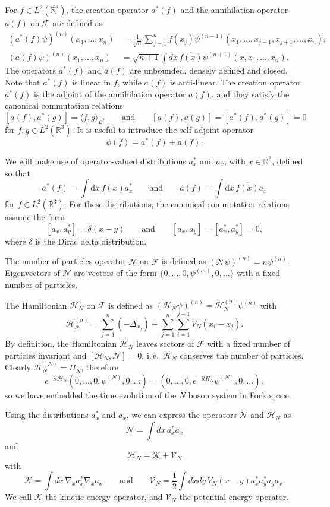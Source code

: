 \documentclass[11pt,a4paper,draft,DIV11]{scrartcl}	%
\newcommand{\R}{\mathds{R}}
\newcommand{\N}{\mathcal{N}}
\newcommand{\K}{\mathcal{K}}
\newcommand{\fock}{\mathcal{F}}		%
\newcommand{\di}{\textrm{d}}		%
\newcommand{\Ncal}{\mathcal{N}}		%
\newcommand{\Hcal}{\mathcal{H}}		%
\newcommand{\cc}[1]{\overline{#1}}	%
\begin{document}
For $f \in L^2(\R^3)$, the creation operator $a^*(f)$ and the annihilation
operator $a(f)$ on $\mathcal{F}$ are defined as
\[
  \begin{split}
    (a^*(f) \psi)^{(n)}(x_1, \dots, x_n) & = \frac{1}{\sqrt{n}} \sum_{j=1}^n
    f(x_j) \psi^{(n-1)}(x_1, \dots, x_{j-1}, x_{j+1}, \dots, x_n), \\
    (a(f) \psi)^{(n)}(x_1, \dots, x_n) & = \sqrt{n+1} \int dx \,
    \overline{f(x)} \psi^{(n+1)}(x, x_1, \dots, x_n).
  \end{split}
\]
The operators $a^*(f)$ and $a(f)$ are unbounded, densely defined and closed.
Note that $a^*(f)$ is linear in $f$, while $a(f)$ is anti-linear. The creation
operator $a^*(f)$ is the adjoint of the annihilation operator $a(f)$, and
they satisfy the canonical commutation relations
\[
  [a(f), a^*(g)] = \langle f, g \rangle_{L^2} \qquad \text{and} \qquad [a(f),
  a(g)] = [a^*(f), a^*(g)] = 0
\]
for $f,g \in L^2(\R^3)$. It is useful to introduce the self-adjoint operator
\[
  \phi(f) = a^*(f) + a(f).
\]


We will make use of operator-valued distributions $a_x^*$ and $a_x$, with $x
\in \R^3$, defined so that
\[
  a^*(f) = \int \di x\, f(x) a^*_x \qquad \text{and} \qquad a(f) = \int \di
  x\, \cc{f(x)} a_x
\]
for $f \in L^2(\R^3)$. For these distributions, the canonical commutation
relations assume the form
\[
  [a_x, a_y^*] = \delta(x-y) \qquad \text{and} \qquad [a_x, a_y] = [a_x^*,
  a_y^*] = 0,
\]
where $\delta$ is the Dirac delta distribution.


The number of particles operator $\mathcal{N}$ on $\mathcal{F}$ is defined as
$(\N \psi)^{(n)} = n \psi^{(n)}$. Eigenvectors of $\N$ are vectors of the form
$\{0, \dots, 0, \psi^{(m)}, 0, \dots \}$ with a fixed number of particles.


The Hamiltonian $\Hcal_N$ on $\mathcal{F}$ is defined as $(\Hcal_N
\psi)^{(n)} = \Hcal_N^{(n)} \psi^{(n)}$ with
\[
  \Hcal_N^{(n)} = \sum_{j=1}^n (-\Delta_{x_j}) + \sum_{j=1}^n
  \sum_{i=1}^{j-1} V_N(x_i - x_j).
\]
By definition, the Hamiltonian
$\Hcal_N$ leaves sectors of $\fock$ with a fixed number of particles
invariant and $[\Hcal_N,\Ncal] = 0$, i.\,e.\ $\Hcal_N$ conserves the number of particles. Clearly $\Hcal_N^{(N)} = H_N$, therefore
\[
e^{-it \Hcal_N} (0,\dots,0, \psi^{(N)},0,\dots) = (0,\dots,0, e^{-itH_N}\psi^{(N)},0,\dots), 
\]
so we have embedded the time evolution of the $N$ boson system in Fock space.

Using the distributions $a_x^*$ and $a_x$, we can express the operators $\N$
and $\Hcal_N$ as
\[
  \N = \int dx \, a_x^* a_x
\]
and
\[
  \Hcal_N = \K + \mathcal{V}_N
\]
with
\[
  \K = \int dx \, \nabla_x a_x^* \nabla_x a_x \qquad \text{and} \qquad
  \mathcal{V}_N = \frac{1}{2} \int dx dy \, V_N(x-y) a_x^* a_y^* a_y a_x.
\]
We call $\K$ the kinetic energy operator, and $\mathcal{V}_N$ the potential
energy operator.
\end{document}
